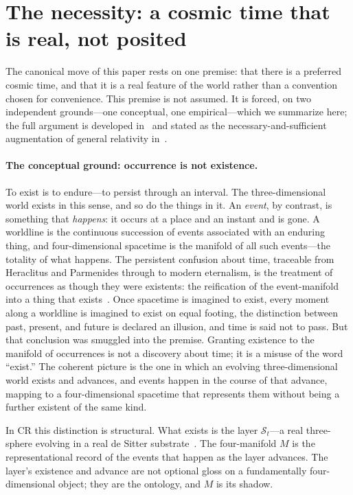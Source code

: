 \documentclass[11pt,a4paper]{article}
\theoremstyle{plain}
\theoremstyle{definition}
\theoremstyle{remark}
\newcommand{\St}{\mathcal{S}_t}
\begin{document}
\section{The necessity: a cosmic time that is real, not posited}\label{sec:necessity}

The canonical move of this paper rests on one premise: that there is a preferred cosmic time, and that it is a real feature of the world rather than a convention chosen for convenience. This premise is not assumed. It is forced, on two independent grounds---one conceptual, one empirical---which we summarize here; the full argument is developed in~\cite{Janzen2025, JanzenWildGoose, JanzenFortress} and stated as the necessary-and-sufficient augmentation of general relativity in~\cite{JanzenModernParallax}.

\paragraph{The conceptual ground: occurrence is not existence.}
To exist is to endure---to persist through an interval. The three-dimensional world exists in this sense, and so do the things in it. An \emph{event}, by contrast, is something that \emph{happens}: it occurs at a place and an instant and is gone. A worldline is the continuous succession of events associated with an enduring thing, and four-dimensional spacetime is the manifold of all such events---the totality of what happens. The persistent confusion about time, traceable from Heraclitus and Parmenides through to modern eternalism, is the treatment of occurrences as though they were existents: the reification of the event-manifold into a thing that exists~\cite{Janzen2025}. Once spacetime is imagined to exist, every moment along a worldline is imagined to exist on equal footing, the distinction between past, present, and future is declared an illusion, and time is said not to pass. But that conclusion was smuggled into the premise. Granting existence to the manifold of occurrences is not a discovery about time; it is a misuse of the word ``exist.'' The coherent picture is the one in which an evolving three-dimensional world exists and advances, and events happen in the course of that advance, mapping to a four-dimensional spacetime that represents them without being a further existent of the same kind.

In CR this distinction is structural. What exists is the layer $\St$---a real three-sphere evolving in a real de Sitter substrate~\cite{JanzenCRframework, JanzenSlicing}. The four-manifold $M$ is the representational record of the events that happen as the layer advances. The layer's existence and advance are not optional gloss on a fundamentally four-dimensional object; they are the ontology, and $M$ is its shadow.
\end{document}
